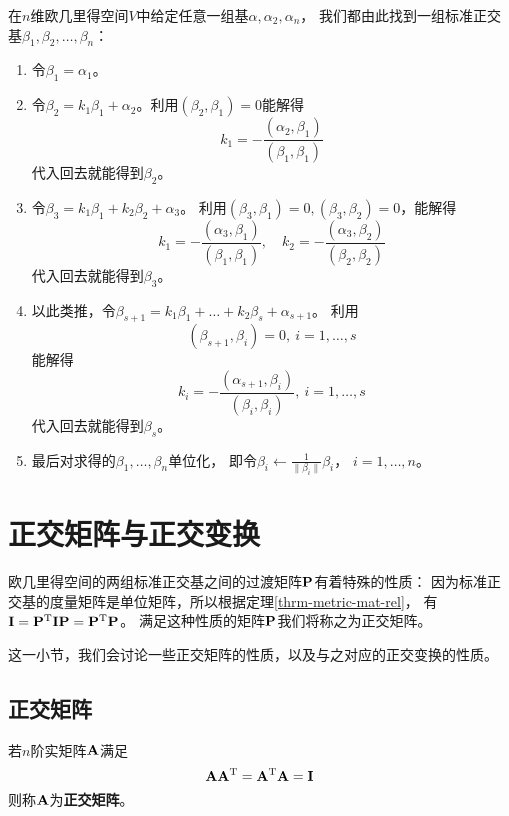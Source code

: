 \begin{theorem}
  在$n$维欧几里得空间$V$中给定任意一组基$\alpha,\alpha_2,\alpha_n$，
  我们都由此找到一组标准正交基$\beta_1,\beta_2,\dots,\beta_n$：
  \begin{enumerate}
    \item
    令$\beta_1=\alpha_1$。
    \item
    令$\beta_2=k_1\beta_1+\alpha_2$。利用$(\beta_2,\beta_1)=0$能解得
    \begin{displaymath}
      k_1 = -\frac{(\alpha_2,\beta_1)}{(\beta_1,\beta_1)}
    \end{displaymath}
    代入回去就能得到$\beta_2$。
    \item
    令$\beta_3=k_1\beta_1+k_2\beta_2+\alpha_3$。
    利用$(\beta_3,\beta_1)=0,(\beta_3,\beta_2)=0$，能解得
    \begin{displaymath}
      k_1 = -\frac{(\alpha_3,\beta_1)}{(\beta_1,\beta_1)},\quad
      k_2 = -\frac{(\alpha_3,\beta_2)}{(\beta_2,\beta_2)}
    \end{displaymath}
    代入回去就能得到$\beta_3$。
    \item
    以此类推，令$\beta_{s+1}=k_1\beta_1+\dots+k_2\beta_s+\alpha_{s+1}$。
    利用\[ (\beta_{s+1},\beta_{i})=0,\ i=1,\dots,s \]
    能解得
    \begin{displaymath}
      k_i = -\frac{(\alpha_{s+1},\beta_{i})}{(\beta_{i},\beta_{i})},
      \ i=1,\dots,s
    \end{displaymath}
    代入回去就能得到$\beta_s$。
    \item
    最后对求得的$\beta_1,\dots,\beta_n$单位化，
    即令$\beta_i\leftarrow\frac{1}{\|\beta_i\|}\beta_i$，
    $i=1,\dots,n$。
  \end{enumerate}
\end{theorem}

\section{正交矩阵与正交变换}
欧几里得空间的两组标准正交基之间的过渡矩阵$\mathbf{P}$有着特殊的性质：
因为标准正交基的度量矩阵是单位矩阵，所以根据定理\ref{thrm-metric-mat-rel}，
有$\mathbf{I}=\mathbf{P}^{\textrm{T}}\mathbf{I}\mathbf{P}=\mathbf{P}^{\textrm{T}}\mathbf{P}$。
满足这种性质的矩阵$\mathbf{P}$我们将称之为正交矩阵。

这一小节，我们会讨论一些正交矩阵的性质，以及与之对应的正交变换的性质。

\subsection{正交矩阵}
\begin{definition}[正交矩阵]
  若$n$阶实矩阵$\mathbf{A}$满足
  \[ \mathbf{A}\mathbf{A}^{\textrm{T}} = \mathbf{A}^{\textrm{T}}\mathbf{A} = \mathbf{I} \]
  则称$\mathbf{A}$为\textbf{正交矩阵}。
\end{definition}


